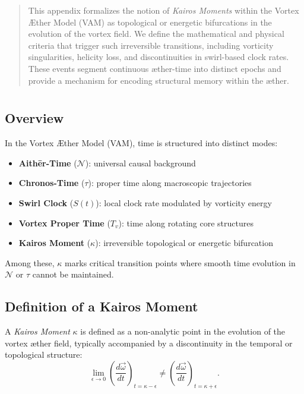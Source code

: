 \documentclass[12pt]{article}
\begin{document}
    \titlepageOpen

    \begin{abstract}
        This appendix formalizes the notion of \textit{Kairos Moments} within the Vortex \AE{}ther Model (VAM) as topological or energetic bifurcations in the evolution of the vortex field. We define the mathematical and physical criteria that trigger such irreversible transitions, including vorticity singularities, helicity loss, and discontinuities in swirl-based clock rates. These events segment continuous æther-time into distinct epochs and provide a mechanism for encoding structural memory within the æther.
    \end{abstract}



    \titlepageClose
    \fi

    \section{\papertitle}

    \subsection*{Overview}
    In the Vortex \AE{}ther Model (VAM), time is structured into distinct modes:
    \begin{itemize}
        \item \textbf{Aith\={e}r-Time} (\( \mathcal{N} \)): universal causal background
        \item \textbf{Chronos-Time} (\( \tau \)): proper time along macroscopic trajectories
        \item \textbf{Swirl Clock} (\( S(t) \)): local clock rate modulated by vorticity energy
        \item \textbf{Vortex Proper Time} (\( T_v \)): time along rotating core structures
        \item \textbf{Kairos Moment} (\( \kappa \)): irreversible topological or energetic bifurcation
    \end{itemize}
    Among these, \( \kappa \) marks critical transition points where smooth time evolution in \( \mathcal{N} \) or \( \tau \) cannot be maintained.

    \subsection{Definition of a Kairos Moment}
    A \textit{Kairos Moment} \( \kappa \) is defined as a non-analytic point in the evolution of the vortex æther field, typically accompanied by a discontinuity in the temporal or topological structure:
    \begin{equation}
        \lim_{\epsilon \to 0} \left( \frac{d\vec{\omega}}{dt} \right)_{t = \kappa - \epsilon}
        \neq
        \left( \frac{d\vec{\omega}}{dt} \right)_{t = \kappa + \epsilon}.
    \end{equation}
\end{document}
